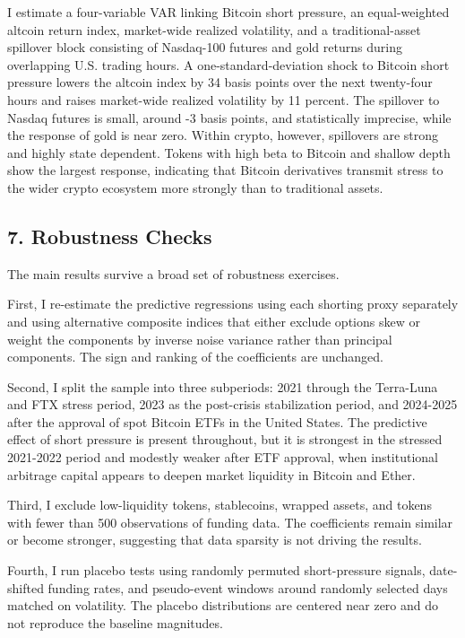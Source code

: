 \documentclass[
]{article}
\begin{document}
I estimate a four-variable VAR linking Bitcoin short pressure, an
equal-weighted altcoin return index, market-wide realized volatility,
and a traditional-asset spillover block consisting of Nasdaq-100 futures
and gold returns during overlapping U.S. trading hours. A
one-standard-deviation shock to Bitcoin short pressure lowers the
altcoin index by 34 basis points over the next twenty-four hours and
raises market-wide realized volatility by 11 percent. The spillover to
Nasdaq futures is small, around -3 basis points, and statistically
imprecise, while the response of gold is near zero. Within crypto,
however, spillovers are strong and highly state dependent. Tokens with
high beta to Bitcoin and shallow depth show the largest response,
indicating that Bitcoin derivatives transmit stress to the wider crypto
ecosystem more strongly than to traditional assets.

\subsection{7. Robustness Checks}\label{7-robustness-checks}

The main results survive a broad set of robustness exercises.

First, I re-estimate the predictive regressions using each shorting
proxy separately and using alternative composite indices that either
exclude options skew or weight the components by inverse noise variance
rather than principal components. The sign and ranking of the
coefficients are unchanged.

Second, I split the sample into three subperiods: 2021 through the
Terra-Luna and FTX stress period, 2023 as the post-crisis stabilization
period, and 2024-2025 after the approval of spot Bitcoin ETFs in the
United States. The predictive effect of short pressure is present
throughout, but it is strongest in the stressed 2021-2022 period and
modestly weaker after ETF approval, when institutional arbitrage capital
appears to deepen market liquidity in Bitcoin and Ether.

Third, I exclude low-liquidity tokens, stablecoins, wrapped assets, and
tokens with fewer than 500 observations of funding data. The
coefficients remain similar or become stronger, suggesting that data
sparsity is not driving the results.

Fourth, I run placebo tests using randomly permuted short-pressure
signals, date-shifted funding rates, and pseudo-event windows around
randomly selected days matched on volatility. The placebo distributions
are centered near zero and do not reproduce the baseline magnitudes.
\end{document}
